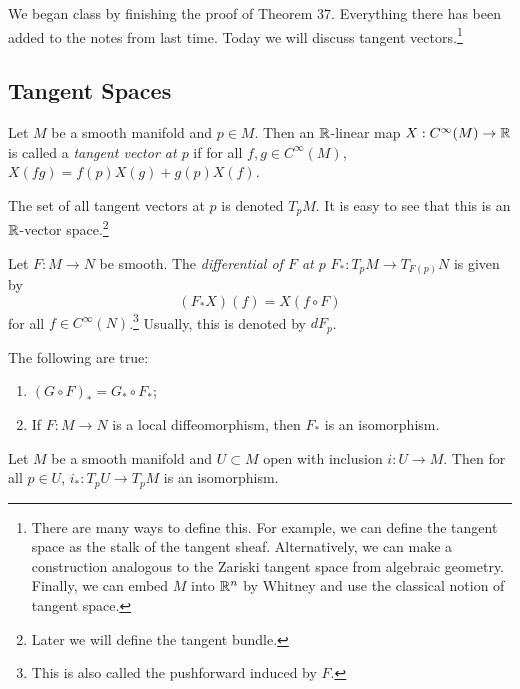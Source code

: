 \documentclass[twoside, 10pt]{article}
\begin{document}
    We began class by finishing the proof of Theorem 37. Everything there has been added to the notes from last time. Today we will discuss tangent vectors.\footnote{There are many ways to define this. For example, we can define the tangent space as the stalk of the tangent sheaf. Alternatively, we can make a construction analogous to the Zariski tangent space from algebraic geometry. Finally, we can embed $M$ into $\mathbb{R}^n$ by Whitney and use the classical notion of tangent space.}

    \subsection{Tangent Spaces}%
    \label{sub:tangent_spaces}
    
    
    \begin{defn}
        Let $M$ be a smooth manifold and $p \in M$. Then an $\mathbb{R}$-linear map $X: C^{\infty}(M) \to \mathbb{R}$ is called a \textit{ tangent vector at $p$ } if for all $f,g \in C^{\infty}(M)$, $X(fg) = f(p)X(g) + g(p)X(f)$.
    \end{defn}

    \begin{notn}
        The set of all tangent vectors at $p$ is denoted $T_pM$. It is easy to see that this is an $\mathbb{R}$-vector space.\footnote{Later we will define the tangent bundle.}
    \end{notn}

    \begin{defn}
        Let $F:M \to N$ be smooth. The \textit{differential of $F$ at $p$} $F_*: T_pM \to T_{F(p)}N$ is given by
        \[(F_*X)(f) = X(f \circ F)\] for all $f \in C^{\infty}(N)$.\footnote{This is also called the pushforward induced by $F$.} Usually, this is denoted by $dF_p$.
    \end{defn}

    \begin{prop}
        The following are true:
        \begin{enumerate}
            \item $(G \circ F)_* = G_* \circ F_*$;
            \item If $F: M \to N$ is a local diffeomorphism, then $F_*$ is an isomorphism.
        \end{enumerate}
    \end{prop}

    \begin{prop}[``Localization'']
        Let $M$ be a smooth manifold and $U \subset M$ open with inclusion $i:U \to M$. Then for all $p \in U$, $i_*:T_pU \to T_pM$ is an isomorphism.
    \end{prop}
    
\end{document}
